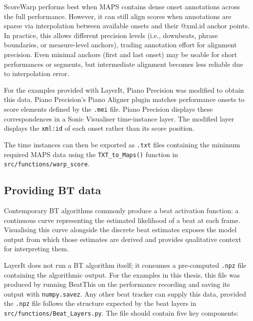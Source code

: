 ScoreWarp performs best when MAPS contains dense onset annotations across the full performance. However, it can still align scores when annotations are sparse via interpolation between available onsets and their @xml.id anchor points. In practice, this allows different precision levels (i.e., downbeats, phrase boundaries, or measure-level anchors), trading annotation effort for alignment precision. Even minimal anchors (first and last onset) may be usable for short performances or segments, but intermediate alignment becomes less reliable due to interpolation error.

For the examples provided with LayerIt, Piano Precision was modified to obtain this data. Piano Precision's Piano Aligner plugin \cite{jiangPIANOPRECISIONADVANCING2025} matches performance onsets to score elements defined by the \texttt{.mei} file. Piano Precision displays these correspondences in a Sonic Visualiser time-instance layer. The modified layer displays the \texttt{xml:id} of each onset rather than its score position.

The time instances can then be exported as \texttt{.txt} files containing the minimum required MAPS data using the \texttt{TXT\_to\_Maps()} function in \texttt{src/functions/warp\_score}.
 
\subsection{Providing BT data}
Contemporary BT algorithms commonly produce a beat activation function: a continuous curve representing the estimated likelihood of a beat at each frame. Visualising this curve alongside the discrete beat estimates exposes the model output from which those estimates are derived and provides qualitative context for interpreting them.

LayerIt does not run a BT algorithm itself; it consumes a pre-computed \texttt{.npz} file containing the algorithmic output. For the examples in this thesis, this file was produced by running BeatThis on the performance recording and saving its output with \texttt{numpy.savez}. Any other beat tracker can supply this data, provided the \texttt{.npz} file follows the structure expected by the beat layers in \texttt{src/functions/Beat\_Layers.py}. The file should contain five key components:

